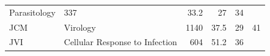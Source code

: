 \documentclass[11pt,]{article}
\begin{document}
\begin{longtable}[]{@{}llrrrr@{}}
\begin{minipage}[t]{0.43\columnwidth}
Parasitology\strut
\end{minipage} & \begin{minipage}[t]{0.04\columnwidth}\raggedleft\strut
337\strut
\end{minipage} & \begin{minipage}[t]{0.08\columnwidth}\raggedleft\strut
33.2\strut
\end{minipage} & \begin{minipage}[t]{0.11\columnwidth}\raggedleft\strut
27\strut
\end{minipage} & \begin{minipage}[t]{0.11\columnwidth}\raggedleft\strut
34\strut
\end{minipage}\tabularnewline
\begin{minipage}[t]{0.06\columnwidth}\raggedright\strut
JCM\strut
\end{minipage} & \begin{minipage}[t]{0.43\columnwidth}\raggedright\strut
Virology\strut
\end{minipage} & \begin{minipage}[t]{0.04\columnwidth}\raggedleft\strut
1140\strut
\end{minipage} & \begin{minipage}[t]{0.08\columnwidth}\raggedleft\strut
37.5\strut
\end{minipage} & \begin{minipage}[t]{0.11\columnwidth}\raggedleft\strut
29\strut
\end{minipage} & \begin{minipage}[t]{0.11\columnwidth}\raggedleft\strut
41\strut
\end{minipage}\tabularnewline
\begin{minipage}[t]{0.06\columnwidth}\raggedright\strut
JVI\strut
\end{minipage} & \begin{minipage}[t]{0.43\columnwidth}\raggedright\strut
Cellular Response to Infection\strut
\end{minipage} & \begin{minipage}[t]{0.04\columnwidth}\raggedleft\strut
604\strut
\end{minipage} & \begin{minipage}[t]{0.08\columnwidth}\raggedleft\strut
51.2\strut
\end{minipage} & \begin{minipage}[t]{0.11\columnwidth}\raggedleft\strut
36\strut
\end{minipage} & \begin{minipage}[t]{0.11\columnwidth}\raggedleft\strut

\end{minipage}
\end{longtable}
\end{document}
